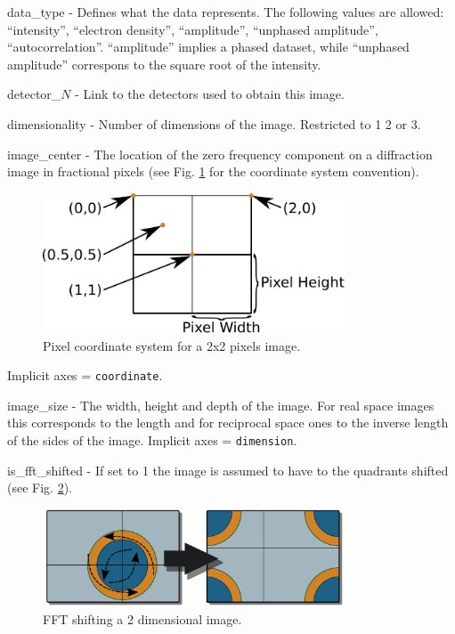\documentclass[usletter,11pt]{article}
\newcommand{\member}[2]
{ \noindent
{ \color{softBlue}  #1 - } #2
\vspace{0.2cm}
}
\begin{document}
\member{data\_type}{Defines what the data represents. The following
  values are allowed: ``intensity'', ``electron density'',
  ``amplitude'', ``unphased amplitude'',
  ``autocorrelation''. ``amplitude'' implies a phased dataset, while
  ``unphased amplitude'' correspons to the square root of the intensity.}

\member{detector\_$N$}{Link to the detectors used to obtain this
image.}

\member{dimensionality}{Number of dimensions of the image. Restricted to 1 2 or 3.}

\member{image\_center}{The location of the zero frequency component on
 a diffraction image in fractional pixels  (see
 Fig. \ref{fig:pixel_coordinates} for the coordinate system convention).

\begin{figure}[h!]
\centering
\includegraphics[width=0.8\textwidth]{pixel_coordinates.pdf}
\caption{Pixel coordinate system for a 2x2 pixels image.}
\label{fig:pixel_coordinates}
\end{figure}

Implicit axes = {\tt coordinate}.
}


\member{image\_size}{The width, height and depth of the image. For
  real space images this corresponds to the length and for reciprocal
  space ones to the inverse length of the sides of the image. Implicit axes = {\tt dimension}.}

\member{is\_fft\_shifted}{If set to 1 the image is assumed to have to
  the quadrants shifted (see Fig. \ref{fig:fft_shift}).

\begin{figure}[h!]
\centering
\includegraphics[width=0.8\textwidth]{fft_shift.pdf}
\caption{FFT shifting a 2 dimensional image.}
\label{fig:fft_shift}
\end{figure}
}
\end{document}

